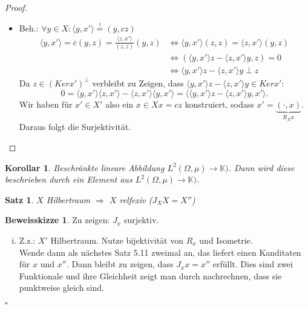 \documentclass[ngerman]{report}
\theoremstyle{plain}%
\newtheorem{thm}{Satz}[chapter]
\newtheorem*{cor*}{Korollar}
\theoremstyle{definition}%
\theoremstyle{myStyle}
\newtheorem*{proof*}{Beweisskizze}
\newenvironment{hinweise}{\footnotesize \begin{proof*}}{\hfill $\square$ \end{proof*}\normalsize}
\newcommand{\K}{\mathbb{K}}
\newcommand{\df}[1][]{%
	\overset{#1}{\Rightarrow}
}
\newcommand{\f}[2]{\langle #1,#2 \rangle} %
\begin{document}
\begin{proof}
\begin{enumerate}[1)]
\begin{itemize}[]
		\item Beh.: $\forall y \in X: \f{y}{x'}\overset{!}{=}(y,cz)$
		\begin{align*}
		\f{y}{x'}=\overline{c}(y,z)=\frac{\f{z}{x'}}{(z,z)}(y,z) &\Leftrightarrow \f{y}{x'}(z,z)=\f{z}{x'}(y,z) \\
		&\Leftrightarrow (\f{y}{x'}z - \f{z}{x'}y, z)=0 \\
		&\Leftrightarrow \f{y}{x'}z - \f{z}{x'}y \perp z
		\end{align*}
		Da $z \in (Ker x')^{\perp}$ verbleibt zu Zeigen, dass $\f{y}{x'}z - \f{z}{x'}y \in Ker x'$:
		\[
		0=\f{y}{x'} \f{z}{x'} - \f{z}{x'} \f{y}{x'} = \f{\f{y}{x'}z - \f{z}{x'}y}{x'}.
		\]
		Wir haben für $x'\in X'$ also ein $x\in X x=cz$ konstruiert, sodass $x'=\underbrace{(\cdot,x)}_{R_X x}$. Daraus folgt die Surjektivität.
		\end{itemize}
		\end{enumerate}
	\end{proof}	

	\begin{cor*}
		Beschränkte lineare Abbildung $L^2(\Omega, \mu) \to \K)$. Dann wird diese beschrieben durch ein Element aus $L^2(\Omega, \mu) \to \K)$.
	\end{cor*}

	\begin{thm}
		$X$ Hilbertraum $\df$ $X$ relfexiv ($J_X X = X''$)
	\end{thm}

	\begin{hinweise}
		Zu zeigen: $J_x$ surjektiv.
		\begin{enumerate}[(i)]
			\item Z.z.: $X'$ Hilbertraum. Nutze bijektivität von $R_x$ und Isometrie.\\ 
			Wende dann als nächstes Satz 5.11 zweimal an, das liefert einen Kanditaten für $x$ und $x''$.
			Dann bleibt zu zeigen, dass $J_x x = x''$ erfüllt.
			Dies sind zwei Funktionale und ihre Gleichheit zeigt man durch nachrechnen, dass sie punktweise gleich sind.
		\end{enumerate}
	\end{hinweise}
\end{document}
